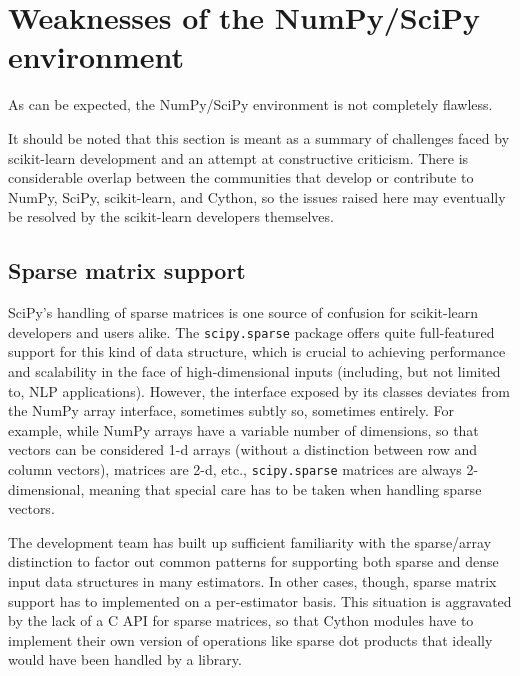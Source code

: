 \documentclass{llncs}
\begin{document}
\section{Weaknesses of the NumPy/SciPy environment}

As can be expected, the NumPy/SciPy environment is not completely flawless.

It should be noted that this section is meant
as a summary of challenges faced by scikit-learn development
and an attempt at constructive criticism.
There is considerable overlap between the communities
that develop or contribute to NumPy, SciPy, scikit-learn, and Cython,
so the issues raised here may eventually be resolved
by the scikit-learn developers themselves.

\subsection{Sparse matrix support}

SciPy's handling of sparse matrices is one source of confusion
for scikit-learn developers and users alike.
The \texttt{scipy.sparse} package offers quite full-featured support
for this kind of data structure,
which is crucial to achieving performance and scalability
in the face of high-dimensional inputs
(including, but not limited to, NLP applications).
However, the interface exposed by its classes
deviates from the NumPy array interface, sometimes subtly so,
sometimes entirely.  %
For example, while NumPy arrays have a variable number of dimensions,
so that vectors can be considered 1-d arrays
(without a distinction between row and column vectors),
matrices are 2-d, etc., \texttt{scipy.sparse} matrices are always 2-dimensional,
meaning that special care has to be taken when handling sparse vectors.

The development team has built up sufficient familiarity
with the sparse/array distinction to factor out common patterns
for supporting both sparse and dense input data structures in many estimators.
In other cases, though, sparse matrix support has to implemented
on a per-estimator basis.
This situation is aggravated by the lack of a C API for sparse matrices,
so that Cython modules have to implement their own version
of operations like sparse dot products
that ideally would have been handled by a library.
\end{document}
